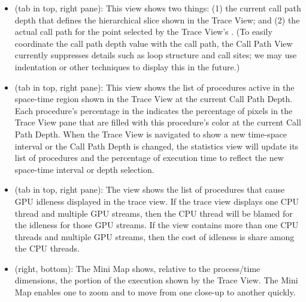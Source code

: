 \begin{itemize}
\item \textbf{\callview} (tab in top, right pane):
  This view shows two things: (1) the current call path depth that defines the hierarchical slice shown in the Trace View; and (2) the actual call path for the point selected by the Trace View's \crosshair{}.
  (To easily coordinate the call path depth value with the call path, the Call Path View currently suppresses details such as loop structure and call sites; we may use indentation or other techniques to display this in the future.)

\item \textbf{\statview} (tab in top, right pane):
  This view shows the list of procedures active  in the  space-time region shown in the Trace View at the current Call Path Depth. Each procedure's percentage in the \statview{} indicates the percentage of pixels in the Trace View pane that are filled with this procedure's color at the current Call Path Depth. When the Trace View is navigated to show a new time-space interval  or the Call Path Depth is  changed, the statistics view will  update its list of procedures and the percentage of execution time to reflect the new space-time interval or depth selection.

\item \textbf{\blameview} (tab in top, right pane):
The view shows the list of procedures that cause GPU idleness displayed in the trace view.
If the trace view displays one CPU thread and multiple GPU streams, then the CPU thread will be blamed for the idleness for those GPU streams.
If the view contains more than one CPU threads and multiple GPU streams, then the cost of idleness is share among the CPU threads.

\item \textbf{\miniview} (right, bottom):
  The Mini Map shows, relative to the process/time dimensions, the portion of the execution shown by the Trace View.
  The Mini Map enables one to zoom and to move from one close-up to another quickly.

\end{itemize}


\subsection{\traceview}
\label{sec:traceview}

